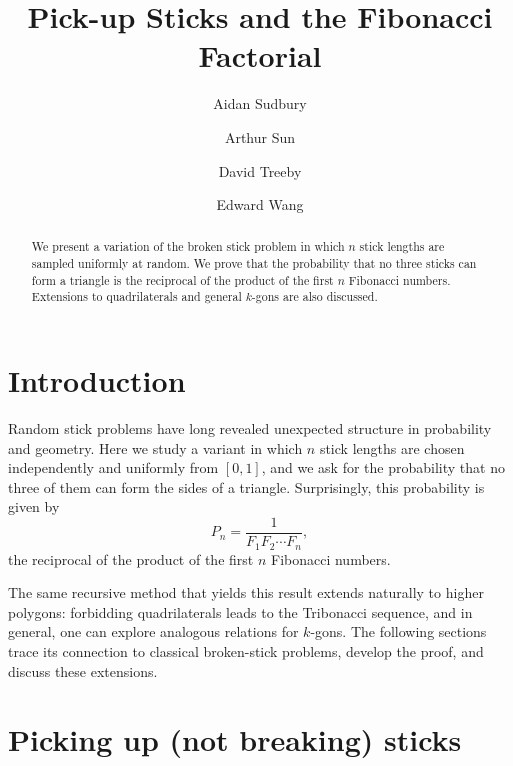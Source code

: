 \documentclass{amsart}
\begin{document}
\title{Pick-up Sticks and the Fibonacci Factorial}

\author[Sudbury]{Aidan Sudbury}
\address{School of Mathematics, Monash University, Australia}

\author[Sun]{Arthur Sun}
\address{Department of Computer Science and Technology, University of Cambridge, UK}

\author[Treeby]{David Treeby}
\address{School of Mathematics, Monash University, Australia}

\author[Wang]{Edward Wang}
\address{School of Mathematics and Statistics, University of Melbourne, Australia}

\begin{abstract}
  We present a variation of the broken stick problem in which $n$ stick lengths are sampled uniformly at random. We prove that the probability that no three sticks can form a triangle is the reciprocal of the product of the first $n$ Fibonacci numbers. Extensions to quadrilaterals and general $k$-gons are also discussed.
\end{abstract}

\maketitle

\section{Introduction}

Random stick problems have long revealed unexpected structure in probability and geometry. Here we study a variant in which $n$ stick lengths are chosen independently and uniformly from $[0,1]$, and we ask for the probability that no three of them can form the sides of a triangle. Surprisingly, this probability is given by \[
  P_n = \frac{1}{F_1 F_2 \cdots F_n},
\] the reciprocal of the product of the first $n$ Fibonacci numbers.

The same recursive method that yields this result extends naturally to higher polygons: forbidding quadrilaterals leads to the Tribonacci sequence, and in general, one can explore analogous relations for $k$-gons. The following sections trace its connection to classical broken-stick problems, develop the proof, and discuss these extensions.

\section{Picking up (not breaking) sticks}
\end{document}
